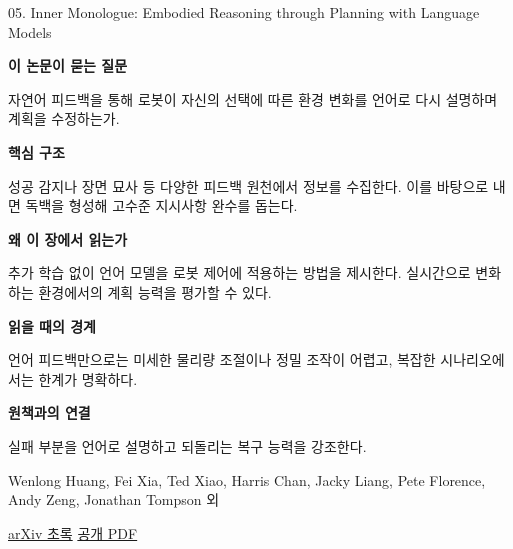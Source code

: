 \documentclass[11pt,openany]{book}
\begin{document}
\begin{termcard}{05. Inner Monologue: Embodied Reasoning through Planning with Language Models}

\par

\medskip

{\sffamily\bfseries\color{deepblue} 이 논문이 묻는 질문}\par

자연어 피드백을 통해 로봇이 자신의 선택에 따른 환경 변화를 언어로 다시 설명하며 계획을 수정하는가.

\smallskip

{\sffamily\bfseries\color{deepblue} 핵심 구조}\par

성공 감지나 장면 묘사 등 다양한 피드백 원천에서 정보를 수집한다. 이를 바탕으로 내면 독백을 형성해 고수준 지시사항 완수를 돕는다.

\smallskip

{\sffamily\bfseries\color{deepblue} 왜 이 장에서 읽는가}\par

추가 학습 없이 언어 모델을 로봇 제어에 적용하는 방법을 제시한다. 실시간으로 변화하는 환경에서의 계획 능력을 평가할 수 있다.

\smallskip

{\sffamily\bfseries\color{coral} 읽을 때의 경계}\par

언어 피드백만으로는 미세한 물리량 조절이나 정밀 조작이 어렵고, 복잡한 시나리오에서는 한계가 명확하다.

\smallskip

{\sffamily\bfseries\color{teal} 원책과의 연결}\par

실패 부분을 언어로 설명하고 되돌리는 복구 능력을 강조한다.

\medskip

{\footnotesize\color{muted} Wenlong Huang, Fei Xia, Ted Xiao, Harris Chan, Jacky Liang, Pete Florence, Andy Zeng, Jonathan Tompson 외\par

\href{https://arxiv.org/abs/2207.05608}{arXiv 초록} \quad \href{https://arxiv.org/pdf/2207.05608}{공개 PDF}\par}

\end{termcard}
\end{document}
